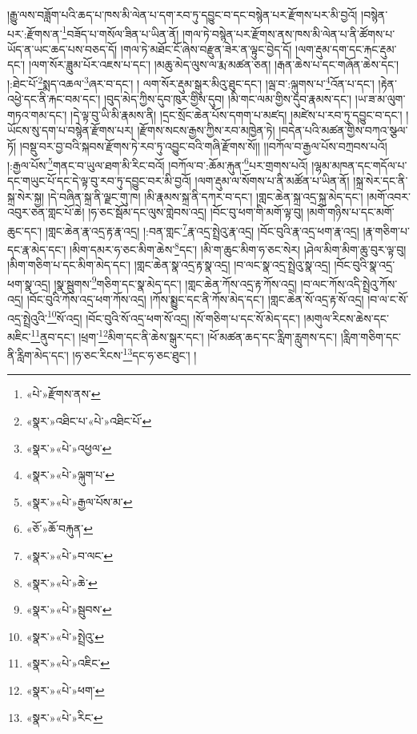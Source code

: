 །རྒྱུ་ལས་བཟློག་པའི་ཆད་པ་ཁས་མི་ལེན་པ་དག་རབ་ཏུ་དབྱུང་བ་དང་བསྙེན་པར་རྫོགས་པར་མི་བྱའོ། །བསྙེན་པར་:རྫོགས་ན་\footnote{«པེ་»རྫོགས་ནས་}བཟོད་པ་གསོལ་ཟིན་པ་ཡིན་ནོ། །གལ་ཏེ་བསྙེན་པར་རྫོགས་ནས་ཁས་མི་ལེན་པ་ནི་ཚོགས་པ་ཡོད་ན་ཡང་ཆད་པས་བཅད་དོ། །གལ་ཏེ་མཐོང་ངོ་ཞེས་བརྫུན་ཟེར་ན་ལྟུང་བྱེད་དོ། །ལག་རྡུམ་དག་དང་རྐང་རྡུམ་དང་། །ལག་སོར་ཟླུམ་པོར་འཇས་པ་དང་། །མཆུ་མེད་ལུས་ལ་རྨ་མཚན་ཅན། །རྒན་ཆེས་པ་དང་གཞོན་ཆེས་དང་། །:ཐེང་པོ་\footnote{«སྣར་»འཐིང་པ་«པེ་»འཐིང་པོ་}སྨད་འཆལ་\footnote{«སྣར་»«པེ་»འཕྱལ་}ཞར་བ་དང་། །
ལག་སོར་རྡུམ་སྒུར་མིའུ་ཐུང་དང་། །ལྦ་བ་:ལྐུགས་པ་\footnote{«སྣར་»«པེ་»ལྐུག་པ་}འོན་པ་དང་། །རྟེན་འཕྱེ་དང་ནི་རྐང་བམ་དང་། །བུད་མེད་ཀྱིས་དུབ་ཁུར་གྱིས་དུབ། །མི་གང་ལམ་གྱིས་དུབ་རྣམས་དང་། །ཡ་ཟ་མ་ལུག་གཏའ་གམ་དང་། །དེ་ལྟ་བུ་ཡི་མི་རྣམས་ནི། །དྲང་སྲོང་ཆེན་པོས་དགག་པ་མཛད། །མཛེས་པ་རབ་ཏུ་དབྱུང་བ་དང་། །ཡོངས་སུ་དག་པ་བསྙེན་རྫོགས་པར། །རྫོགས་སངས་རྒྱས་ཀྱིས་རབ་མཁྱེན་ཏེ། །བདེན་པའི་མཚན་གྱིས་བཀའ་སྩལ་ཏོ། །བསྡུ་བར་བྱ་བའི་སྐབས་རྫོགས་ཏེ་རབ་ཏུ་འབྱུང་བའི་གཞི་རྫོགས་སོ།། །།བཀོལ་བ་རྒྱལ་པོས་བཀྲབས་པའོ། །:རྒྱལ་པོས་\footnote{«སྣར་»«པེ་»རྒྱལ་པོས་མ་}གནང་བ་ཡུལ་ཐག་མི་རིང་བའོ། །བཀོལ་བ་:ཆོམ་རྐུན་\footnote{«ཅོ་»ཆོ་བརྐུན་}པར་གྲགས་པའོ། །ལྷམ་མཁན་དང་གདོལ་པ་དང་གཡུང་པོ་དང་དེ་ལྟ་བུ་རབ་ཏུ་དབྱུང་བར་མི་བྱའོ། །ལག་རྡུམ་ལ་སོགས་པ་ནི་མཚོན་པ་ཡིན་ནོ། །སྐྲ་སེར་དང་ནི་སྐྲ་སེར་སྐྱ། །དེ་བཞིན་སྐྲ་ནི་ལྗང་གུ་ཁ། །མི་རྣམས་སྐྲ་ནི་དཀར་བ་དང་། །གླང་ཆེན་སྐྲ་འདྲ་སྐྲ་མེད་དང་། །མགོ་འབར་འབུར་ཅན་གླང་པོ་ཆེ། །ཧ་ཅང་སྦོམ་དང་ལུས་གླེབས་འདྲ། །བོང་བུ་ཕག་གི་མགོ་ལྟ་བུ། །མགོ་གཉིས་པ་དང་མགོ་ཆུང་དང་། །གླང་ཆེན་རྣ་འདྲ་རྟ་རྣ་འདྲ། །:བན་གླང་\footnote{«སྣར་»«པེ་»བ་ལང་}རྣ་འདྲ་སྤྲེའུ་རྣ་འདྲ། །བོང་བུའི་རྣ་འདྲ་ཕག་རྣ་འདྲ། །རྣ་གཅིག་པ་དང་རྣ་མེད་དང་། །མིག་དམར་ཧ་ཅང་མིག་ཆེས་\footnote{«སྣར་»«པེ་»ཆེ་}དང་། །མི་ག་ཆུང་མིག་ཧ་ཅང་སེར། །ཤེལ་མིག་མིག་ཆུ་བུར་ལྟ་བུ། །མིག་གཅིག་པ་དང་མིག་མེད་དང་། །གླང་ཆེན་སྣ་འདྲ་རྟ་སྣ་འདྲ། །བ་ལང་སྣ་འདྲ་སྤྲེའུ་སྣ་འདྲ། །བོང་བུའི་སྣ་འདྲ་ཕག་སྣ་འདྲ། །སྣ་སྦུགས་\footnote{«སྣར་»«པེ་»སྦུབས་}གཅིག་དང་སྣ་མེད་དང་། །གླང་ཆེན་ཀོས་འདྲ་རྟ་ཀོས་འདྲ། །བ་ལང་ཀོས་འདི་སྤྲེའུ་ཀོས་འདྲ། །བོང་བུའི་ཀོས་འདྲ་ཕག་ཀོས་འདྲ། །ཀོས་སྨྱུང་དང་ནི་ཀོས་མེད་དང་། །གླང་ཆེན་སོ་འདྲ་རྟ་སོ་འདྲ། །བ་ལ་ང་སོ་འདྲ་སྤྲེའུའི་\footnote{«སྣར་»«པེ་»སྤྲེའུ་}སོ་འདྲ། །བོང་བུའི་སོ་འདྲ་ཕག་སོ་འདྲ། །སོ་གཅིག་པ་དང་སོ་མེད་དང་། །མགུལ་རིངས་ཆེས་དང་མཇིང་\footnote{«སྣར་»«པེ་»འཇིང་}ནུབ་དང་། །ཕྲག་\footnote{«སྣར་»«པེ་»ཕག་}མིག་དང་ནི་ཆེས་སྒུར་དང་། །ཕོ་མཚན་ཆད་དང་རླིག་རླུགས་དང་། །རླིག་གཅིག་དང་ནི་རླིག་མེད་དང་། །ཧ་ཅང་རིངས་\footnote{«སྣར་»«པེ་»རིང་}དང་ཧ་ཅང་ཐུང་། །
